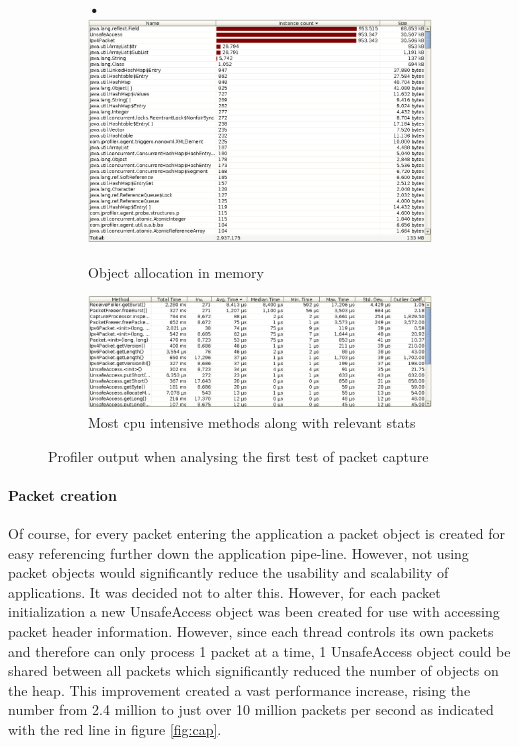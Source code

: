 \documentclass[final_report.tex]{subfiles}
\begin{document}
\begin{figure}[H]
	\centering
	\begin{subfigure}{0.5\textwidth}\textbf{•}
		\includegraphics[width=\textwidth]{../../data/pctest2/memory_all_objects.png}
		\caption{Object allocation in memory}
		\label{fig:mem2}
	\end{subfigure}%
	\begin{subfigure}{0.5\textwidth}
		\includegraphics[width=\textwidth]{../../data/pctest1/cpu_methods.png}
		\caption{Most cpu intensive methods along with relevant stats}
		\label{fig:cpu2}
	\end{subfigure}
	\caption{Profiler output when analysing the first test of packet capture}
	\label{fig:pro2}
\end{figure}

\paragraph*{Packet creation}
Of course, for every packet entering the application a packet object is created for easy referencing further down the application pipe-line. However, not using packet objects would significantly reduce the usability and scalability of applications. It was decided not to alter this. However, for each packet initialization a new UnsafeAccess object was been created for use with accessing packet header information. However, since each thread controls its own packets and therefore can only process 1 packet at a time, 1 UnsafeAccess object could be shared between all packets which significantly reduced the number of objects on the heap. This improvement created a vast performance increase, rising the number from 2.4 million to just over 10 million packets per second as indicated with the red line in figure \ref{fig:cap}.
\end{document}
